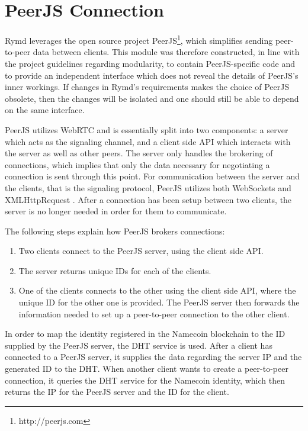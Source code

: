 \section{PeerJS Connection}
\label{sec:p2p}

Rymd leverages the open source project PeerJS\footnote{http://peerjs.com}, which simplifies sending peer-to-peer data between clients. This module was therefore constructed, in line with the project guidelines regarding modularity, to contain PeerJS-specific code and to provide an independent interface which does not reveal the details of PeerJS's inner workings. If changes in Rymd's requirements makes the choice of PeerJS obsolete, then the changes will be isolated and one should still be able to depend on the same interface.

PeerJS utilizes WebRTC and is essentially split into two components: a server which acts as the signaling channel, and a client side API which interacts with the server as well as other peers. The server only handles the brokering of connections, which implies that only the data necessary for negotiating a connection is sent through this point. For communication between the server and the clients, that is the signaling protocol, PeerJS utilizes both WebSockets and XMLHttpRequest \cite{PeerjsGithub:2014:Online}. After a connection has been setup between two clients, the server is no longer needed in order for them to communicate.

The following steps explain how PeerJS brokers connections:
\begin{enumerate}
\item Two clients connect to the PeerJS server, using the client side API.
\item The server returns unique IDs for each of the clients.
\item One of the clients connects to the other using the client side API, where the unique ID for the other one is provided. The PeerJS server then forwards the information needed to set up a peer-to-peer connection to the other client.
\end{enumerate}

In order to map the identity registered in the Namecoin blockchain to the ID supplied by the PeerJS server, the DHT service is used. After a client has connected to a PeerJS server, it supplies the data regarding the server IP and the generated ID to the DHT. When another client wants to create a peer-to-peer connection, it queries the DHT service for the Namecoin identity, which then returns the IP for the PeerJS server and the ID for the client.

